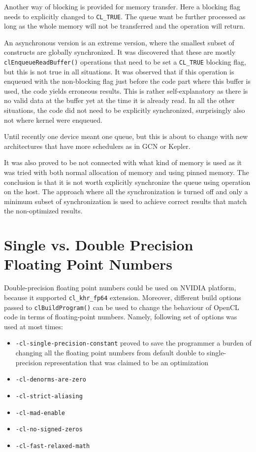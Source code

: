 Another way of blocking is provided for memory transfer. Here a blocking flag needs to explicitly changed to \texttt{CL\_TRUE}. The queue want be further processed as long as the whole memory will not be transferred and the operation will return.

An asynchronous version is an extreme version, where the smallest subset of constructs are globally synchronized. It was discovered that these are mostly \texttt{clEnqueueReadBuffer()} operations that need to be set a \texttt{CL\_TRUE} blocking flag, but this is not true in all situations. It was observed that if this operation is enqueued with the non-blocking flag just before the code part where this buffer is used, the code yields erroneous results. This is rather self-explanatory as there is no valid data at the buffer yet at the time it is already read. In all the other situations, the code did not need to be explicitly synchronized, surprisingly also not where kernel were enqueued.

Until recently one device meant one queue, but this is about to change with new architectures that have more schedulers as in GCN or Kepler.

It was also proved to be not connected with what kind of memory is used as it was tried with both normal allocation of memory and using pinned memory.
The conclusion is that it is not worth explicitly synchronize the queue using operation on the host. The approach where all the synchronization is turned off and only a minimum subset of synchronization is used to achieve correct results that match the non-optimized results.

\section{Single vs. Double Precision Floating Point Numbers}
Double-precision floating point numbers could be used on NVIDIA platform, because it supported \texttt{cl\_khr\_fp64} extension. Moreover, different build options passed to \texttt{clBuildProgram()} can be used to change the behaviour of OpenCL code in terms of floating-point numbers. Namely, following set of options was used at most times:


\begin{itemize}
\item \texttt{-cl-single-precision-constant} proved to save the programmer a burden of changing all the floating point numbers from default double to single-precision representation that was claimed to be an optimization \cite{nvidia2011openclbest}
\item \texttt{-cl-denorms-are-zero}
\item \texttt{-cl-strict-aliasing}
\item \texttt{-cl-mad-enable}
\item \texttt{-cl-no-signed-zeros}
\item \texttt{-cl-fast-relaxed-math}
\end{itemize}

